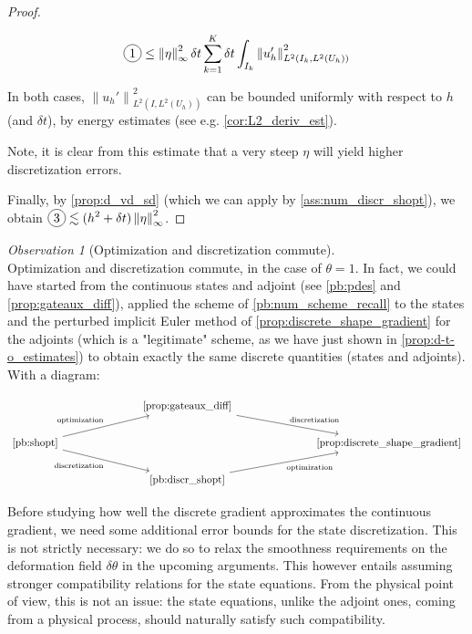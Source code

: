\documentclass[english,a4paper,9pt,oneside]{scrbook}	%
\theoremstyle{break}
\newenvironment{mproof}[1][\proofname]{%
  \begin{proof}[#1]$ $\par\nobreak\ignorespaces
}{%
  \end{proof}
}
\renewcommand*{\proofname}{Proof}
\theoremstyle{remark}
\newtheorem{obs}[equation]{Observation}
\newcommand{\ds}{\displaystyle}
\newcommand{\norm}[1]{\left\lVert#1\right\rVert}
\newcommand*\circled[1]{\tikz[baseline=(char.base)]{
            \node[shape=circle,draw,inner sep=2pt] (char) {#1};}}
\begin{document}
\begin{mproof}
\begin{align*}
 \circled{1} \leq \norm{\eta}_\infty^2 \delta t \sum_{k=1}^{K} \delta t \int_{I_k}\norm{u_h'}_{L^2(I_k , L^2(U_h))}^2 
\end{align*}

In both cases, $\norm{u_h'}_{L^2(I,L^2(U_h))}^2$ can be bounded uniformly with respect to $h$ (and $\delta t$), by energy estimates (see e.g. \cref{cor:L2_deriv_est}).

Note, it is clear from this estimate that a very steep $\eta$ will yield higher discretization errors.

Finally, by \cref{prop:d_vd_sd} (which we can apply by \cref{ass:num_discr_shopt}), we obtain $\ds \circled{3} \lesssim (h^2+\delta t)\norm{\eta}_\infty^2 $.


\end{mproof}

\begin{obs}[Optimization and discretization commute]
\mbox{}\\
Optimization and discretization commute, in the case of $\theta=1$. In fact, we could have started from the continuous states and adjoint (see \cref{pb:pdes} and \cref{prop:gateaux_diff}), applied the scheme of \cref{pb:num_scheme_recall} to the states and the perturbed implicit Euler method of \cref{prop:discrete_shape_gradient} for the adjoints (which is a "legitimate" scheme, as we have just shown in \cref{prop:d-t-o_estimates}) to obtain exactly the same discrete quantities (states and adjoints).\mbox{}\\
With a diagram:

\[\begin{tikzcd}
	&&& \text{\cref{prop:gateaux_diff}} \\
	\text{\cref{pb:shopt}} &&&&&& \text{\cref{prop:discrete_shape_gradient}}  \\
	&&& \text{\cref{pb:discr_shopt}} 
	\arrow["{\text{optimization}}"', from=3-4, to=2-7]
	\arrow["{\text{discretization}}", from=1-4, to=2-7]
	\arrow["{\text{optimization}}", from=2-1, to=1-4]
	\arrow["{\text{discretization}}"', from=2-1, to=3-4]
\end{tikzcd}\]


\end{obs}


Before studying how well the discrete gradient approximates the continuous gradient, we need some additional error bounds for the state discretization. This is not strictly necessary: we do so to relax the smoothness requirements on the deformation field $\delta \theta$ in the upcoming arguments. This however entails assuming stronger compatibility relations for the state equations. From the physical point of view, this is not an issue: the state equations, unlike the adjoint ones, coming from a physical process, should naturally satisfy such compatibility. 
\end{document}
